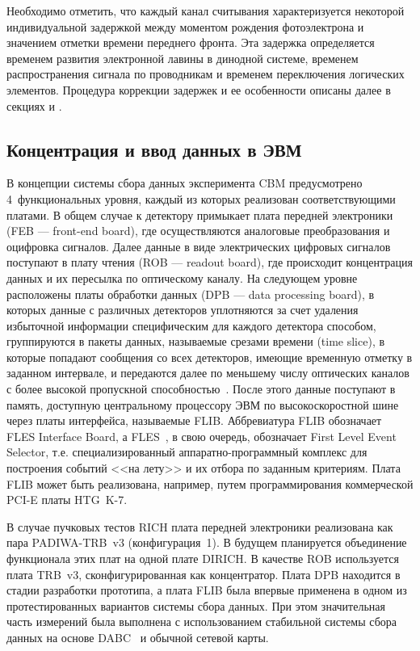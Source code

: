 Необходимо отметить, что каждый канал считывания характеризуется некоторой индивидуальной задержкой между моментом рождения фотоэлектрона и значением отметки времени переднего фронта. Эта задержка определяется временем развития электронной лавины в динодной системе, временем распространения сигнала по проводникам и временем переключения логических элементов. Процедура коррекции задержек и ее особенности описаны далее в секциях \cite{} и \cite{}.

\subsection{Концентрация и ввод данных в ЭВМ}

В концепции системы сбора данных эксперимента CBM предусмотрено 4~функциональных уровня, каждый из которых реализован соответствующими платами. В общем случае к детектору примыкает плата передней электроники (FEB --- front-end board), где осуществляются аналоговые преобразования и оцифровка сигналов.
Далее данные в виде электрических цифровых сигналов поступают в плату чтения (ROB --- readout board), где происходит концентрация данных и их пересылка по оптическому каналу.
На следующем уровне расположены платы обработки данных (DPB --- data processing board), в которых данные с различных детекторов уплотняются за счет удаления избыточной информации специфическим для каждого детектора способом, группируются в пакеты данных, называемые срезами времени (time slice), в которые попадают сообщения со всех детекторов, имеющие временную отметку в заданном интервале, и передаются далее по меньшему числу оптических каналов с более высокой пропускной способностью~\cite{}. После этого данные поступают в память, доступную центральному процессору ЭВМ по высокоскоростной шине через платы интерфейса, называемые FLIB. Аббревиатура FLIB обозначает FLES Interface Board, а FLES~\cite{FLES}, в свою очередь, обозначает First Level Event Selector, т.е. специализированный аппаратно-программный комплекс для построения событий <<на лету>> и их отбора по заданным критериям. Плата FLIB может быть реализована, например, путем программирования коммерческой PCI-E платы HTG~K-7.

В случае пучковых тестов RICH плата передней электроники реализована как пара PADIWA-TRB~v3 (конфигурация~1). В будущем планируется объединение функционала этих плат на одной плате DIRICH. В качестве ROB используется плата TRB~v3, сконфигурированная как концентратор. Плата DPB находится в стадии разработки прототипа, а плата FLIB была впервые применена в одном из протестированных вариантов системы сбора данных. При этом значительная часть измерений была выполнена с использованием стабильной системы сбора данных на основе DABC~\cite{DABC} и обычной сетевой карты.
